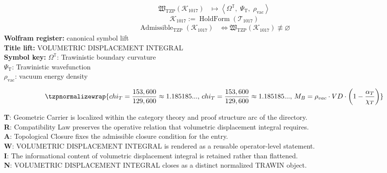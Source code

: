 \noindent
\begin{minipage}[t]{0.48\linewidth}
\begingroup
\small
\[
\begin{aligned}
\mathfrak{W}_{\mathrm{TZP}}\!\left(\mathcal{K}_{1017}\right)
&\longmapsto
\left\langle \Omega^{\mathbb{T}},\; \Psi_{\mathrm{T}},\; \rho_{\mathrm{vac}} \right\rangle
\end{aligned}
\]
\[
\mathcal{K}_{1017}
:=
\operatorname{HoldForm}\!\left(\mathcal{T}_{1017}\right)
\]
\[
\begin{aligned}
\operatorname{Admissible}_{\mathrm{TZP}}\!\left(\mathcal{K}_{1017}\right)
&\Longleftrightarrow
\mathfrak{W}_{\mathrm{TZP}}\!\left(\mathcal{K}_{1017}\right)\not\equiv\varnothing
\end{aligned}
\]
\textbf{Wolfram register:} canonical symbol lift\\
\textbf{Title lift:} VOLUMETRIC DISPLACEMENT INTEGRAL\\
\textbf{Symbol key:} \(\Omega^{\mathbb{T}}\): Trawinistic boundary curvature\\ \(\Psi_{\mathrm{T}}\): Trawinistic wavefunction\\ \(\rho_{\mathrm{vac}}\): vacuum energy density
\par
\endgroup
\end{minipage}\hfill
\begin{minipage}[t]{0.48\linewidth}
\[
\tzpnormalizewrap{chi_T = \frac{153,600}{129,600} \approx 1.185185...,\,chi_T = \frac{153,600}{129,600} \approx 1.185185...,\,M_B = \rho_{vac} \cdot VD \cdot \left(1 - \frac{\alpha_T}{\chi_T}\right)}
\]

\small
\textbf{T}: Geometric Carrier is localized within the category theory and proof structure arc of the directory.\\
\textbf{R}: Compatibility Law preserves the operative relation that volumetric displacement integral requires.\\
\textbf{A}: Topological Closure fixes the admissible closure condition for the entry.\\
\textbf{W}: VOLUMETRIC DISPLACEMENT INTEGRAL is rendered as a reusable operator-level statement.\\
\textbf{I}: The informational content of volumetric displacement integral is retained rather than flattened.\\
\textbf{N}: VOLUMETRIC DISPLACEMENT INTEGRAL closes as a distinct normalized TRAWIN object.
\normalsize
\end{minipage}

